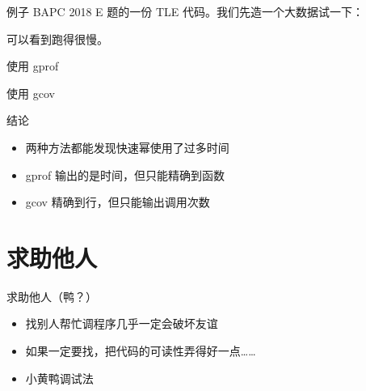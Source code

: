 \documentclass[10pt,mathserif]{beamer}%
\begin{document}
\begin{frame}{例子}
	BAPC 2018 E 题的一份 TLE 代码。我们先造一个大数据试一下：
	
	可以看到跑得很慢。
\end{frame}

\begin{frame}{使用 gprof}
	
\end{frame}

\begin{frame}[allowframebreaks]{使用 gcov}
	
\end{frame}

\begin{frame}{结论}
	\begin{itemize}
		\item 两种方法都能发现快速幂使用了过多时间
		\item gprof 输出的是时间，但只能精确到函数
		\item gcov 精确到行，但只能输出调用次数
	\end{itemize}
\end{frame}

\section{求助他人}
\begin{frame}{求助他人（鸭？）}
	\begin{itemize}
		\item 找别人帮忙调程序几乎一定会破坏友谊
		\item 如果一定要找，把代码的可读性弄得好一点……
		\item 小黄鸭调试法
	\end{itemize}
\end{frame}

{\xdbg%
\begin{frame}
\end{frame}}
\end{document}
